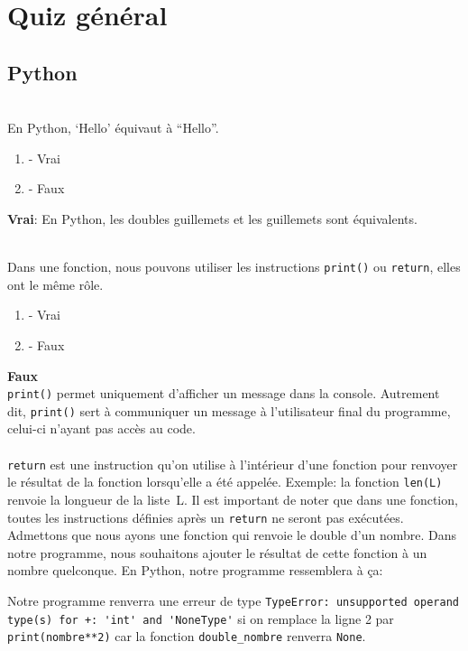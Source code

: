 \section{Quiz général}

\subsection{Python}

\begin{Exercice}[2 minutes]\\
En Python, `Hello' équivaut à ``Hello''. 

\begin{enumerate}
    \item - Vrai
    \item - Faux
\end{enumerate}
\begin{solution}
    \textbf{Vrai}: En Python, les doubles guillemets et les guillemets sont équivalents. 
\end{solution}
\end{Exercice}


\begin{Exercice}[2 minutes]\\
Dans une fonction, nous pouvons utiliser les instructions \lstinline{print()} ou \lstinline{return}, elles ont le même rôle.
\begin{enumerate}
    \item - Vrai
    \item - Faux
\end{enumerate}
\begin{solution}
    \textbf{Faux}\\
    \lstinline{print()} permet uniquement d'afficher un message dans la console. Autrement dit, \lstinline{print()} sert à communiquer un message à l'utilisateur final du programme, celui-ci n'ayant pas accès au code.\\\\
    \lstinline{return} est une instruction qu'on utilise à l'intérieur d'une fonction pour renvoyer le résultat de la fonction lorsqu'elle a été appelée. Exemple: la fonction \lstinline{len(L)} renvoie la longueur de la liste~L. Il est important de noter que dans une fonction, toutes les instructions définies après un \lstinline{return} ne seront pas exécutées.\\

    Admettons que nous ayons une fonction qui renvoie le double d'un nombre. Dans notre programme, nous souhaitons ajouter le résultat de cette fonction à un nombre quelconque.
    En Python, notre programme ressemblera à ça:
    

    Notre programme renverra une erreur de type \lstinline{TypeError: unsupported operand type(s) for +: 'int' and 'NoneType'} si on remplace la ligne 2 par \lstinline{print(nombre**2)} car la fonction \lstinline{double_nombre} renverra \lstinline{None}.
\end{solution}
\end{Exercice}


